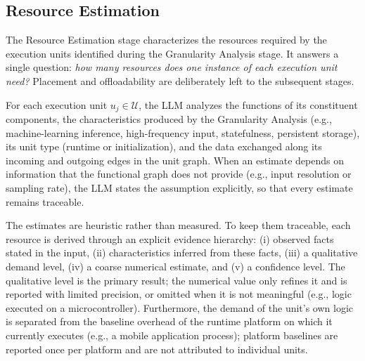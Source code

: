 \subsection{Resource Estimation}

The Resource Estimation stage characterizes the resources required by the
execution units identified during the Granularity Analysis stage. It answers a
single question: \emph{how many resources does one instance of each execution
unit need?} Placement and offloadability are deliberately left to the
subsequent stages.

For each execution unit $u_j\in\mathcal{U}$, the LLM analyzes the functions of
its constituent components, the characteristics produced by the Granularity
Analysis (e.g., machine-learning inference, high-frequency input, statefulness,
persistent storage), its unit type (runtime or initialization), and the data
exchanged along its incoming and outgoing edges in the unit graph. When an
estimate depends on information that the functional graph does not provide
(e.g., input resolution or sampling rate), the LLM states the assumption
explicitly, so that every estimate remains traceable.

The estimates are heuristic rather than measured. To keep them traceable, each
resource is derived through an explicit evidence hierarchy: (i) observed facts
stated in the input, (ii) characteristics inferred from these facts, (iii) a
qualitative demand level, (iv) a coarse numerical estimate, and (v) a
confidence level. The qualitative level is the primary result; the numerical
value only refines it and is reported with limited precision, or omitted when
it is not meaningful (e.g., logic executed on a microcontroller). Furthermore,
the demand of the unit's own logic is separated from the baseline overhead of
the runtime platform on which it currently executes (e.g., a mobile
application process); platform baselines are reported once per platform and
are not attributed to individual units.

